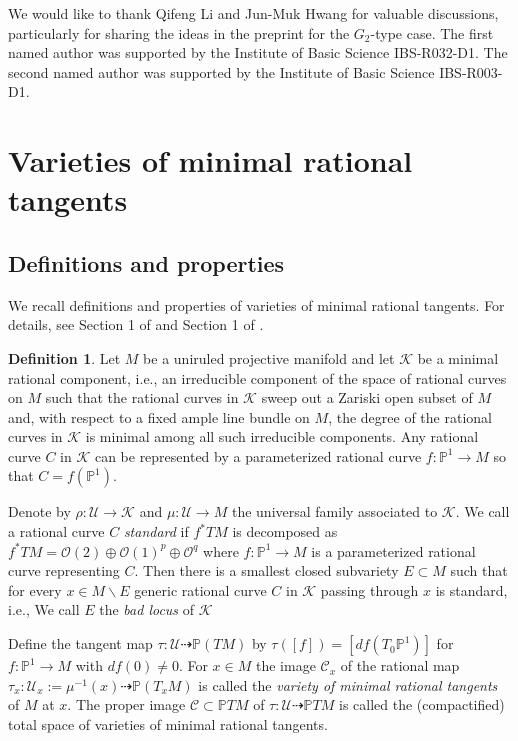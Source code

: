 \documentclass[12pt]{amsart}
\theoremstyle{plain}
\theoremstyle{definition}
\newtheorem{definition} [theorem] {Definition}
\begin{document}
%
We would like to thank  Qifeng Li and Jun-Muk Hwang for  valuable discussions, particularly for sharing the ideas in the preprint for the   $G_2$-type case.
The first named author was supported by the Institute of Basic Science IBS-R032-D1. The second named author was  supported by the Institute of Basic Science IBS-R003-D1.


\section{Varieties of minimal rational tangents} \label{sect:vmrt}

\subsection{Definitions and properties}

We recall definitions and properties of varieties of minimal rational tangents. For details, see  Section 1 of \cite{HM99} and Section 1 of \cite{Mk08}.

\begin{definition} Let $M$ be a uniruled projective manifold and let $\mathcal K$ be a minimal rational component, i.e., an irreducible component of the space of rational curves on $M$ such that the rational curves in $\mathcal K$ sweep out a Zariski open subset of $M$ and, with respect to a fixed ample line bundle on $M$, the degree of the rational curves in $\mathcal K$  is minimal among all such irreducible components. Any rational curve $C$ in $\mathcal K$ can be represented by a parameterized rational curve $f: \mathbb P^1 \rightarrow M$ so that $C=f(\mathbb P^1)$.

 Denote    by $\rho:\mathcal U \rightarrow \mathcal K$ and $\mu:\mathcal U \rightarrow M$  the universal family associated to $\mathcal K$.
 We call a rational curve $C$ \emph{standard} if $f^*TM$ is decomposed as  $f^*TM=\mathcal O(2) \oplus \mathcal O(1)^p \oplus \mathcal O^q$ where $f:\mathbb P^1 \rightarrow M$ is a parameterized rational curve representing $C $.
Then there is a smallest closed subvariety $E \subset M$   such that for every $x \in M\backslash E$ generic rational curve $C$ in $\mathcal K$ passing through $x$ is standard, i.e.,
We call $E$    the \emph{bad locus} of $\mathcal K$

Define the tangent map $\tau: \mathcal U \dashrightarrow \mathbb P(TM)$ by $\tau([f])=[df(T_0\mathbb P^1)]$ for $f:\mathbb P^1 \rightarrow M$ with $df(0)\not=0$.
For $x \in M$ the image $\mathcal C_x$ of the rational map $\tau_x: \mathcal U_x:=\mu^{-1}(x) \dashrightarrow \mathbb P(T_xM)$ is called the \emph{variety of minimal rational tangents} of $M$ at $x$.
The proper image $\mathcal C \subset \mathbb PTM$  of $\tau: \mathcal U \dashrightarrow \mathbb P TM$ is called the
(compactified) total space of varieties of minimal rational tangents.

\end{definition}
\end{document}
